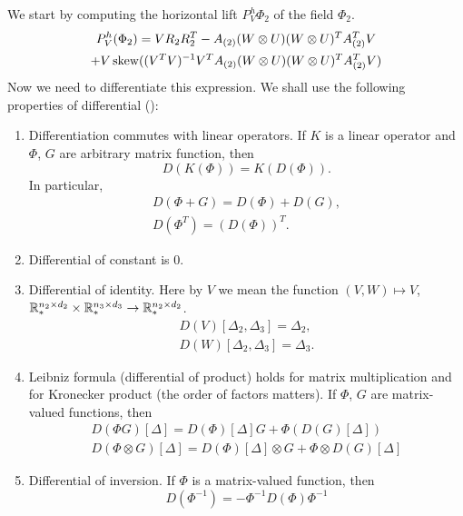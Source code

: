 We start by computing the horizontal lift $P^h_V\Phi_2$ of the field $\Phi_2$.
\begin{multline}
 P^h_V( \Phi_2 ) = V R_2 R_2^T - A_{(2)} (W \otimes U) (W \otimes U)^T A_{(2)}^T V \\
 + V \operatorname*{skew}( (V^T V)^{-1} V^T A_{(2)} (W \otimes U)(W \otimes U)^T A_{(2)}^T V )
\end{multline}
Now we need to differentiate this expression. We shall use the following properties
of differential (\cite{matrix_cookbook}):
\begin{enumerate}
    \item Differentiation commutes with linear operators. If $K$ is a linear operator and $\Phi$, $G$ are
    arbitrary matrix function, then 
    \begin{equation}
    D(K(\Phi)) = K(D(\Phi)).
    \end{equation}
        In particular, 
        \begin{eqnarray}
        D(\Phi+G) = D(\Phi) + D(G),\\ 
        D(\Phi^T) = (D(\Phi))^T.
        \end{eqnarray}
    \item Differential of constant is $0$.
    \item Differential of identity. Here by $V$ we mean the function
        $ (V, W) \mapsto V$,
        $\mathbb{R}^{n_2 \times d_2}_{*}  \times \mathbb{R}^{n_3 \times d_3}_{*} \to \mathbb{R}^{n_2 \times d_2}_{*}$.
        \begin{eqnarray}
        D(V)[\Delta_2, \Delta_3] = \Delta_2, \\
        D(W)[\Delta_2, \Delta_3] = \Delta_3.
        \end{eqnarray}
    \item Leibniz formula (differential of product) holds for matrix multiplication
        and for Kronecker product (the order of factors matters). If $\Phi$, $G$ are matrix-valued
        functions, then
        \begin{eqnarray}
        D(\Phi G)[\Delta] = D(\Phi)[\Delta] G + \Phi (D(G)[\Delta]) \\
        D(\Phi \otimes G)[\Delta] = D(\Phi)[\Delta] \otimes G + \Phi \otimes D(G)[\Delta]
        \end{eqnarray}
        \item Differential of inversion. If $\Phi$ is a matrix-valued function, then
        \begin{equation}
        D(\Phi^{-1}) = - \Phi^{-1} D(\Phi) \Phi^{-1}
        \end{equation}
\end{enumerate}

